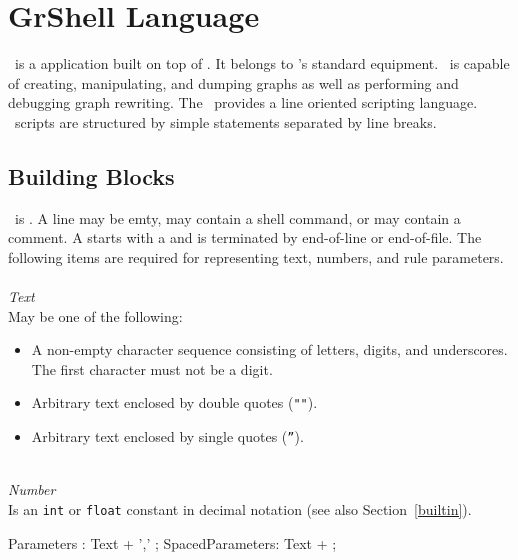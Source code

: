 \chapter{GrShell Language}
\label{chapgrshell}
\GrShell\ is a  application built on top of \LibGr{}. 
It belongs to \GrG's standard equipment. 
\GrShell\ is capable of creating, manipulating, and dumping graphs as well as performing and debugging graph rewriting.
The \GrShell\ provides a line oriented scripting language. 
\GrShell\ scripts are structured by simple statements separated by line breaks.


\section{Building Blocks}

\GrShell\ is . 
A line may be emty, may contain a shell command, or may contain a comment. 
A  starts with a \indexed{\texttt{\#}} and is terminated by end-of-line or end-of-file. 
The following items are required for representing text, numbers, and rule parameters.\\
\\
\emph{Text}\\
May be one of the following:
\begin{itemize}
  \item A non-empty character sequence consisting of letters, digits, and underscores. The first character must not be a digit.
  \item Arbitrary text enclosed by double quotes (\texttt{""}).
  \item Arbitrary text enclosed by single quotes (\texttt{''}).
\end{itemize}
\mbox{ }\\
\emph{Number}\\
Is an \texttt{int} or \texttt{float} constant in decimal notation (see also Section~\ref{builtin}).

\begin{rail} 
 Parameters : Text + ',' ;
 SpacedParameters: Text + ; 
\end{rail}


